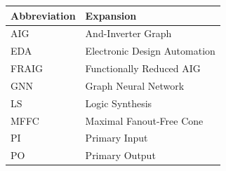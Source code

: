 \begin{table}[h]
\centering
\begin{tabular}{@{} l l @{}}
\toprule
\textbf{Abbreviation} & \textbf{Expansion} \\
\midrule
AIG & And-Inverter Graph \\
EDA & Electronic Design Automation \\
FRAIG & Functionally Reduced AIG \\
GNN & Graph Neural Network \\
LS & Logic Synthesis \\
MFFC & Maximal Fanout-Free Cone \\
PI & Primary Input \\
PO & Primary Output \\
\bottomrule
\end{tabular}
\end{table}
